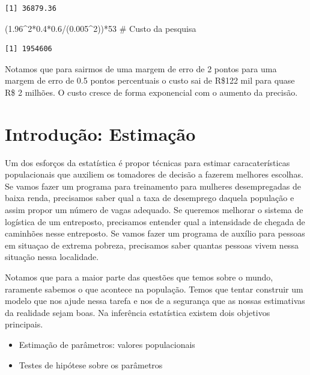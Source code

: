 \documentclass[
  letterpaper,
  DIV=11,
  numbers=noendperiod]{scrartcl}
\newenvironment{Shaded}{\begin{snugshade}}{\end{snugshade}}
\newcommand{\CommentTok}[1]{\textcolor[rgb]{0.37,0.37,0.37}{#1}}
\newcommand{\DecValTok}[1]{\textcolor[rgb]{0.68,0.00,0.00}{#1}}
\newcommand{\FloatTok}[1]{\textcolor[rgb]{0.68,0.00,0.00}{#1}}
\newcommand{\NormalTok}[1]{\textcolor[rgb]{0.00,0.23,0.31}{#1}}
\newcommand{\SpecialCharTok}[1]{\textcolor[rgb]{0.37,0.37,0.37}{#1}}
\begin{document}
\begin{verbatim}
[1] 36879.36
\end{verbatim}

\begin{Shaded}
\begin{Highlighting}[]
\NormalTok{(}\FloatTok{1.96}\SpecialCharTok{\^{}}\DecValTok{2}\SpecialCharTok{*}\FloatTok{0.4}\SpecialCharTok{*}\FloatTok{0.6}\SpecialCharTok{/}\NormalTok{(}\FloatTok{0.005}\SpecialCharTok{\^{}}\DecValTok{2}\NormalTok{))}\SpecialCharTok{*}\DecValTok{53} \CommentTok{\# Custo da pesquisa}
\end{Highlighting}
\end{Shaded}

\begin{verbatim}
[1] 1954606
\end{verbatim}

Notamos que para sairmos de uma margem de erro de 2 pontos para uma
margem de erro de 0.5 pontos percentuais o custo sai de R\$122 mil para
quase R\$ 2 milhões. O custo cresce de forma exponencial com o aumento
da precisão.

\section{Introdução: Estimação}\label{introduuxe7uxe3o-estimauxe7uxe3o}

Um dos esforços da estatística é propor técnicas para estimar
caracaterísticas populacionais que auxiliem os tomadores de decisão a
fazerem melhores escolhas. Se vamos fazer um programa para treinamento
para mulheres desempregadas de baixa renda, precisamos saber qual a taxa
de desemprego daquela população e assim propor um número de vagas
adequado. Se queremos melhorar o sistema de logística de um entreposto,
precisamos entender qual a intensidade de chegada de caminhões nesse
entreposto. Se vamos fazer um programa de auxílio para pessoas em
situaçao de extrema pobreza, precisamos saber quantas pessoas vivem
nessa situação nessa localidade.

Notamos que para a maior parte das questões que temos sobre o mundo,
raramente sabemos o que acontece na população. Temos que tentar
construir um modelo que nos ajude nessa tarefa e nos de a segurança que
as nossas estimativas da realidade sejam boas. Na inferência estatística
existem dois objetivos principais.

\begin{itemize}
\item Estimação de parâmetros: valores populacionais
\item Testes de hipótese sobre os parâmetros
\end{itemize}
\end{document}
